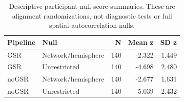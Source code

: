 \begin{table}[htbp]
\centering
\small
\caption{Descriptive participant null-score summaries. These are alignment randomizations, not diagnostic tests or full spatial-autocorrelation nulls.}\label{tab:Snull}
\begin{tabular}{llrrr}
\toprule
Pipeline & Null & N & Mean z & SD z \\
\midrule
GSR & Network/hemisphere & 140 & -2.322 & 1.449 \\
GSR & Unrestricted & 140 & -4.698 & 2.480 \\
noGSR & Network/hemisphere & 140 & -2.677 & 1.631 \\
noGSR & Unrestricted & 140 & -5.039 & 2.432 \\
\bottomrule
\end{tabular}
\end{table}
